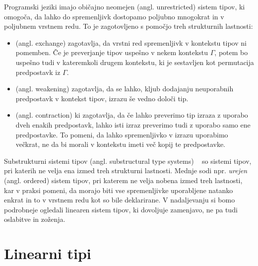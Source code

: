 Programski jeziki imajo običajno neomejen (angl. unrestricted) sistem tipov, ki omogoča, da lahko do spremenljivk dostopamo poljubno mnogokrat in v poljubnem vrstnem redu. To je zagotovljeno s pomočjo treh strukturnih lastnosti:
\begin{itemize}
    \itemsep 0em
    \item {} (angl. exchange) zagotavlja, da vrstni red spremenljivk v kontekstu tipov ni pomemben. Če je preverjanje tipov uspešno v nekem kontekstu $\Gamma$, potem bo uspešno tudi v kateremkoli drugem kontekstu, ki je sestavljen kot permutacija predpostavk iz $\Gamma$.
    \item {} (angl. weakening) zagotavlja, da se lahko, kljub dodajanju neuporabnih predpostavk v kontekst tipov, izrazu še vedno določi tip.
    \item {} (angl. contraction) ki zagotavlja, da če lahko preverimo tip izraza z uporabo dveh enakih predpostavk, lahko isti izraz preverimo tudi z uporabo samo ene predpostavke. To pomeni, da lahko spremenljivko v izrazu uporabimo večkrat, ne da bi morali v kontekstu imeti več kopij te predpostavke.
\end{itemize}

Substrukturni sistemi tipov (angl. substructural type systems) ~\cite{pierce2004advanced} so sistemi tipov, pri katerih ne velja ena izmed treh strukturni lastnosti. Mednje sodi npr. \textit{urejen} (angl. ordered) sistem tipov, pri katerem ne velja nobena izmed treh lastnosti, kar v praksi pomeni, da morajo biti vse spremenljivke uporabljene natanko enkrat in to v vrstnem redu kot so bile deklarirane. V nadaljevanju si bomo podrobneje ogledali linearen sistem tipov, ki dovoljuje zamenjavo, ne pa tudi oslabitve in zoženja.

\section{Linearni tipi}
\label{sec:linearni-tipi}


